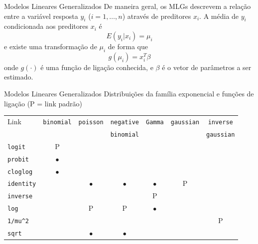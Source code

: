 \documentclass[10pt]{beamer}\usepackage[]{graphicx}\usepackage[]{color}
\begin{document}
\begin{frame}[fragile=singleslide]{Modelos Lineares Generalizados}
De maneira geral, os MLGs descrevem a relação entre a variável resposta
$y_i$ ($i = 1, \ldots, n$) através de preditores $x_i$. A média de $y_i$
condicionada aos preditores $x_i$ é
\begin{equation*}
  E(y_i|x_i) = \mu_i
\end{equation*}
e existe uma transformação de $\mu_i$ de forma que
\begin{equation*}
  g(\mu_i) = x_{i}^{T}\beta
\end{equation*}
onde $g(\cdot)$ é uma função de ligação conhecida, e $\beta$ é o vetor
de parâmetros a ser estimado.
\end{frame}

\begin{frame}[fragile=singleslide]{Modelos Lineares Generalizados}
Distribuições da família exponencial e funções de ligação (P = link
padrão)
\begin{center}
\begin{table}[h!]
\renewcommand{\baselinestretch}{1}
\small\footnotesize\scriptsize
\begin{tabular}{lcccccc}
\hline
Link & \texttt{binomial} & \texttt{poisson} & \texttt{negative} &
\texttt{Gamma} & \texttt{gaussian} & \texttt{inverse}\\
    &       &    & \texttt{binomial} &  &  & \texttt{gaussian} \\
\hline
\texttt{logit} & P & & & & & \\
\texttt{probit} & $\bullet$ & & & & &  \\
\texttt{cloglog} & $\bullet$ & & & & &  \\
\texttt{identity} &  & $\bullet$ & $\bullet$ & $\bullet$ & P &  \\
\texttt{inverse} &  & & & P & &  \\
\texttt{log} &  & P & P & $\bullet$ & &  \\
\verb|1/mu^2| & & & & & & P  \\
\texttt{sqrt} & & $\bullet$ & $\bullet$ & & &  \\
\hline
\end{tabular}
\end{table}
\end{center}
\end{frame}
\end{document}
